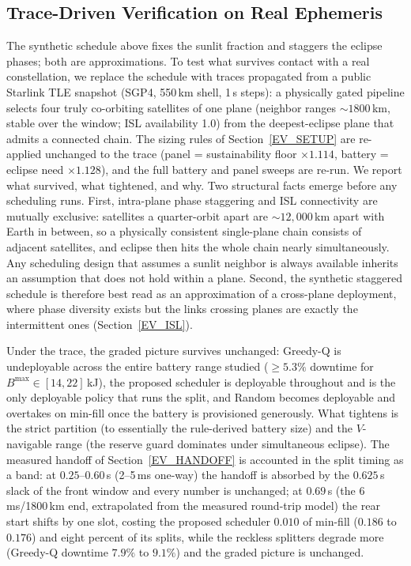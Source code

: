 \subsection{Trace-Driven Verification on Real Ephemeris}\label{EV_TLE}
The synthetic schedule above fixes the sunlit fraction and staggers the eclipse
phases; both are approximations. To test what survives contact with a real
constellation, we replace the schedule with traces propagated from a public
Starlink TLE snapshot (SGP4, 550\,km shell, 1\,s steps): a physically gated
pipeline selects four truly co-orbiting satellites of one plane (neighbor
ranges ${\sim}1800$\,km, stable over the window; ISL availability 1.0) from the
deepest-eclipse plane that admits a connected chain. The sizing rules of
Section~\ref{EV_SETUP} are re-applied unchanged to the trace (panel =
sustainability floor $\times1.114$, battery = eclipse need $\times1.128$), and
the full battery and panel sweeps are re-run. We report what survived, what
tightened, and why. Two structural facts emerge before any scheduling runs.
First, intra-plane phase staggering and ISL connectivity are mutually
exclusive: satellites a quarter-orbit apart are ${\sim}12{,}000$\,km apart with
Earth in between, so a physically consistent single-plane chain consists of
adjacent satellites, and eclipse then hits the whole chain nearly
simultaneously. Any scheduling design that assumes a sunlit neighbor is always
available inherits an assumption that does not hold within a plane. Second, the
synthetic staggered schedule is therefore best read as an approximation of a
cross-plane deployment, where phase diversity exists but the links crossing
planes are exactly the intermittent ones (Section~\ref{EV_ISL}).

Under the trace, the graded picture survives unchanged: Greedy-Q is
undeployable across the entire battery range studied ($\ge 5.3\%$ downtime for
$B^{\max}\in[14,22]$\,kJ), the proposed scheduler is deployable throughout and
is the only deployable policy that runs the split, and Random becomes
deployable and overtakes on min-fill once the battery is provisioned
generously. What tightens is the strict partition (to essentially the
rule-derived battery size) and the $V$-navigable range (the reserve guard
dominates under simultaneous eclipse). The measured handoff of
Section~\ref{EV_HANDOFF} is accounted in the split timing as a band: at
$0.25$--$0.60$\,s (2--5\,ms one-way) the handoff is absorbed by the $0.625$\,s
slack of the front window and every number is unchanged; at $0.69$\,s (the
6\,ms/1800\,km end, extrapolated from the measured round-trip model) the rear
start shifts by one slot, costing the proposed scheduler $0.010$ of min-fill
($0.186$ to $0.176$) and eight percent of its splits, while the reckless
splitters degrade more (Greedy-Q downtime $7.9\%$ to $9.1\%$) and the graded
picture is unchanged.

